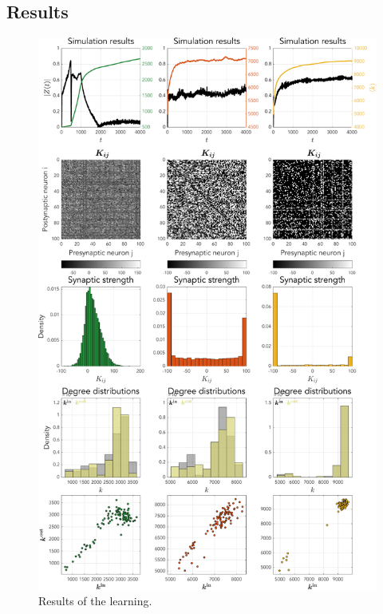 \subsection{Results}
\begin{figure}[H]
\centering
\includegraphics[height = \textheight]{../Figures/Learning/STDP.pdf}
\caption{Results of the \STDP learning.}
\label{fig:STDP}
\end{figure}


